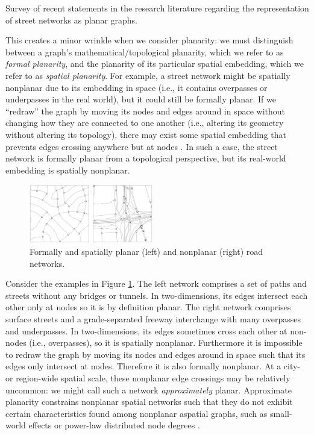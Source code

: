 \documentclass[Afour,sageh,times]{sagej}
\begin{document}
\begin{table}[htbp]
\centering
\caption{Survey of recent statements in the research literature regarding the representation of street networks as planar graphs.}
\label{tab:planar_quotes}

\end{table}

This creates a minor wrinkle when we consider planarity: we must distinguish between a graph's mathematical/topological planarity, which we refer to as \emph{formal planarity}, and the planarity of its particular spatial embedding, which we refer to as \emph{spatial planarity}. For example, a street network might be spatially nonplanar due to its embedding in space (i.e., it contains overpasses or underpasses in the real world), but it could still be formally planar. If we \enquote{redraw} the graph by moving its nodes and edges around in space without changing how they are connected to one another (i.e., altering its geometry without altering its topology), there may exist some spatial embedding that prevents edges crossing anywhere but at nodes \citep[p.~6]{barthelemy_morphogenesis_2017}. In such a case, the street network is formally planar from a topological perspective, but its real-world embedding is spatially nonplanar.

\begin{figure}[tbp]
	\center
	\includegraphics[width=0.48\textwidth]{planar_vs_not.png}
	\caption{Formally and spatially planar (left) and nonplanar (right) road networks.}
	\label{fig:planar_vs_not}
\end{figure}

Consider the examples in Figure \ref{fig:planar_vs_not}. The left network comprises a set of paths and streets without any bridges or tunnels. In two-dimensions, its edges intersect each other only at nodes so it is by definition planar. The right network comprises surface streets and a grade-separated freeway interchange with many overpasses and underpasses. In two-dimensions, its edges sometimes cross each other at non-nodes (i.e., overpasses), so it is spatially nonplanar. Furthermore it is impossible to redraw the graph by moving its nodes and edges around in space such that its edges only intersect at nodes. Therefore it is also formally nonplanar. At a city- or region-wide spatial scale, these nonplanar edge crossings may be relatively uncommon: we might call such a network \emph{approximately} planar. Approximate planarity constrains nonplanar spatial networks such that they do not exhibit certain characteristics found among nonplanar aspatial graphs, such as small-world effects or power-law distributed node degrees \citep{crucitti_centrality_2006,fischer_spatial_2014}.
\end{document}
